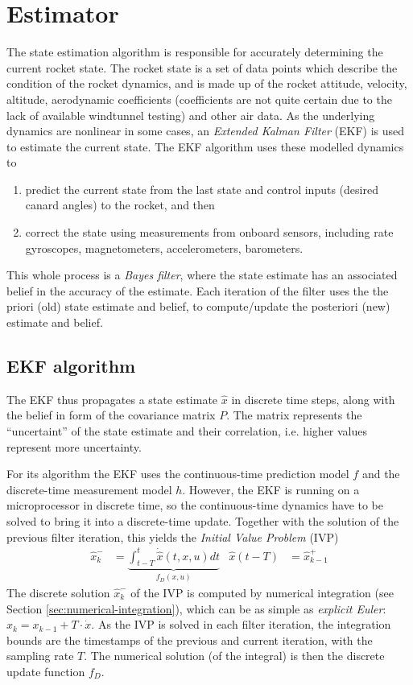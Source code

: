 \section{Estimator} \label{sec:estimator}
The state estimation algorithm is responsible for accurately determining the current rocket state.
The rocket state is a set of data points which describe the condition of the rocket dynamics, and is made up of the rocket attitude, velocity, altitude, aerodynamic coefficients (coefficients are not quite certain due to the lack of available windtunnel testing) and other air data.
As the underlying dynamics are nonlinear in some cases, an \textit{Extended Kalman Filter} (EKF) is used to estimate the current state. The EKF algorithm uses these modelled dynamics to
\begin{enumerate}
    \item predict the current state from the last state and control inputs (desired canard angles) to the rocket, and then
    \item correct the state using measurements from onboard sensors, including rate gyroscopes, magnetometers, accelerometers, barometers.
\end{enumerate}
This whole process is a \textit{Bayes filter}, where the state estimate has an associated belief in the accuracy of the estimate.
Each iteration of the filter uses the the priori (old) state estimate and belief, to compute/update the posteriori (new) estimate and belief.

\subsection{EKF algorithm}
The EKF thus propagates a state estimate $\hat x$ in discrete time steps, along with the belief in form of the covariance matrix $P$.
The matrix represents the ``uncertaint'' of the state estimate and their correlation, i.e. higher values represent more uncertainty.

For its algorithm the EKF uses the continuous-time prediction model $f$ and the discrete-time measurement model $h$.
However, the EKF is running on a microprocessor in discrete time, so the continuous-time dynamics have to be solved to bring it into a discrete-time update. 
Together with the solution of the previous filter iteration, this yields the \textit{Initial Value Problem} (IVP) 
\begin{align}
     \hat x_k^- &= \underbrace{\int_{t-T}^{t} \dot{\hat x}(t,x,u) dt}_{f_D(x,u)}
     &
     \hat x (t-T) &= \hat x_{k-1}^+
\end{align}
The discrete solution $\hat x_k^-$ of the IVP is computed by numerical integration (see Section \ref{sec:numerical-integration}), which can be as simple as \textit{explicit Euler}: $x_k = x_{k-1} + T \cdot \dot x$.
As the IVP is solved in each filter iteration, the integration bounds are the timestamps of the previous and current iteration, with the sampling rate $T$.
The numerical solution (of the integral) is then the discrete update function $f_D$.

